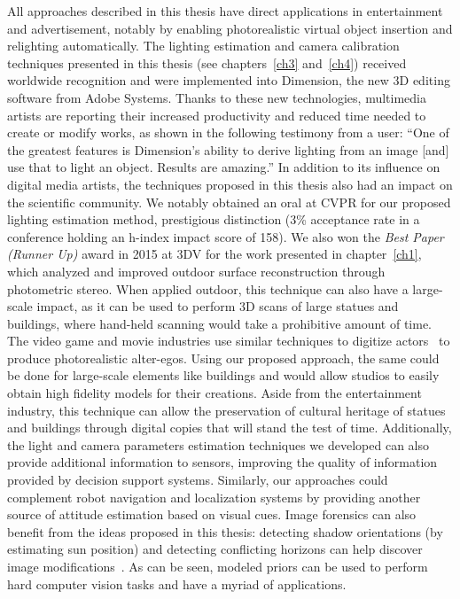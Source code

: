 All approaches described in this thesis have direct applications in entertainment and advertisement, notably by enabling photorealistic virtual object insertion and relighting automatically. The lighting estimation and camera calibration techniques presented in this thesis (see chapters~\ref{ch3} and~\ref{ch4}) received worldwide recognition and were implemented into Dimension, the new 3D editing software from Adobe Systems. Thanks to these new technologies, multimedia artists are reporting their increased productivity and reduced time needed to create or modify works, as shown in the following testimony from a user: ``One of the greatest features is Dimension's ability to derive lighting from an image [and] use that to light an object. Results are amazing.'' In addition to its influence on digital media artists, the techniques proposed in this thesis also had an impact on the scientific community. We notably obtained an oral at CVPR for our proposed lighting estimation method, prestigious distinction (3\% acceptance rate in a conference holding an h-index impact score of 158). We also won the \emph{Best Paper (Runner Up)} award in 2015 at 3DV for the work presented in chapter~\ref{ch1}, which analyzed and improved outdoor surface reconstruction through photometric stereo. When applied outdoor, this technique can also have a large-scale impact, as it can be used to perform 3D scans of large statues and buildings, where hand-held scanning would take a prohibitive amount of time. The video game and movie industries use similar techniques to digitize actors~\cite{debevec2000acquiring} to produce photorealistic alter-egos. Using our proposed approach, the same could be done for large-scale elements like buildings and would allow studios to easily obtain high fidelity models for their creations. Aside from the entertainment industry, this technique can allow the preservation of cultural heritage of statues and buildings through digital copies that will stand the test of time. Additionally, the light and camera parameters estimation techniques we developed can also provide additional information to sensors, improving the quality of information provided by decision support systems. Similarly, our approaches could complement robot navigation and localization systems by providing another source of attitude estimation based on visual cues. Image forensics can also benefit from the ideas proposed in this thesis: detecting shadow orientations (by estimating sun position) and detecting conflicting horizons can help discover image modifications~\cite{Farid2010}. As can be seen, modeled priors can be used to perform hard computer vision tasks and have a myriad of applications.

